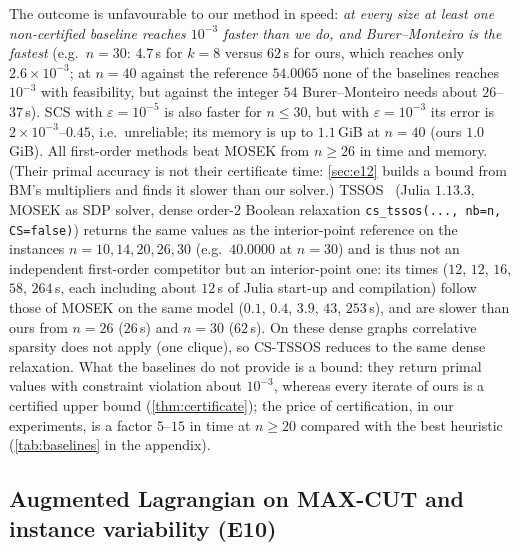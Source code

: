 \documentclass[a4paper,11pt]{article}
\theoremstyle{plain}
\theoremstyle{definition}
\theoremstyle{remark}
\begin{document}
The outcome is unfavourable to our method in speed: \emph{at every size at least one non-certified baseline reaches $10^{-3}$ faster than we do, and Burer--Monteiro is the fastest} (e.g.\ $n=30$: $4.7$\,s for $k=8$ versus $62$\,s for ours, which reaches only $2.6\times10^{-3}$; at $n=40$ against the reference $54.0065$ none of the baselines reaches $10^{-3}$ with feasibility, but against the integer $54$ Burer--Monteiro needs about $26$--$37$\,s). SCS with $\varepsilon=10^{-5}$ is also faster for $n\le30$, but with $\varepsilon=10^{-3}$ its error is $2\times10^{-3}$--$0.45$, i.e.\ unreliable; its memory is up to $1.1$\,GiB at $n=40$ (ours $1.0$\,GiB). All first-order methods beat MOSEK from $n\ge26$ in time and memory. (Their primal accuracy is not their certificate time: \cref{sec:e12} builds a bound from BM's multipliers and finds it slower than our solver.) TSSOS~\cite{magron2021tssos} (Julia $1.13.3$, MOSEK as SDP solver, dense order-$2$ Boolean relaxation \texttt{cs\_tssos(..., nb=n, CS=false)}) returns the same values as the interior-point reference on the instances $n=10,14,20,26,30$ (e.g.\ $40.0000$ at $n=30$) and is thus not an independent first-order competitor but an interior-point one: its times ($12$, $12$, $16$, $58$, $264$\,s, each including about $12$\,s of Julia start-up and compilation) follow those of MOSEK on the same model ($0.1$, $0.4$, $3.9$, $43$, $253$\,s), and are slower than ours from $n=26$ ($26$\,s) and $n=30$ ($62$\,s). On these dense graphs correlative sparsity does not apply (one clique), so CS-TSSOS reduces to the same dense relaxation. What the baselines do not provide is a bound: they return primal values with constraint violation about $10^{-3}$, whereas every iterate of ours is a certified upper bound (\cref{thm:certificate}); the price of certification, in our experiments, is a factor $5$--$15$ in time at $n\ge20$ compared with the best heuristic (\cref{tab:baselines} in the appendix).

\subsection{Augmented Lagrangian on MAX-CUT and instance variability (E10)}\label{sec:e10}
\end{document}
